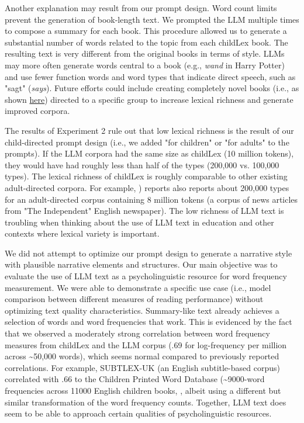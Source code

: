 \documentclass[doc, a4paper]{apa7}
\begin{document}
Another explanation may result from our prompt design. Word count limits prevent the generation of book-length text. We prompted the LLM multiple times to compose a summary for each book. This procedure allowed us to generate a substantial number of words related to the topic from each childLex book. The resulting text is very different from the original books in terms of style. LLMs may more often generate words central to a book (e.g., \textit{wand} in Harry Potter) and use fewer function words and word types that indicate direct speech, such as "sagt" (\textit{says}). Future efforts could include creating completely novel books (i.e., as shown \href{https://medium.com/@baen2810/ai-assisted-writing-of-a-book-cataclysm-67788412fb31}{here}) directed to a specific group to increase lexical richness and generate improved corpora. 

The results of Experiment 2 rule out that low lexical richness is the result of our child-directed prompt design (i.e., we added "for children" or "for adults" to the prompts). If the LLM corpora had the same size as childLex (10 million tokens), they would have had roughly less than half of the types (200,000 vs. 100,000 types). The lexical richness of childLex is roughly comparable to other existing adult-directed corpora. For example, \citet{baayen_word_2001}) reports also reports about 200,000 types for an adult-directed corpus containing 8 million tokens (a corpus of news articles from "The Independent" English newspaper). The low richness of LLM text is troubling when thinking about the use of LLM text in education \citep[see also ][]{kasneci_chatgpt_2023} and other contexts where lexical variety is important.

We did not attempt to optimize our prompt design to generate a narrative style with plausible narrative elements and structures. Our main objective was to evaluate the use of LLM text as a psycholinguistic resource for word frequency measurement. We were able to demonstrate a specific use case (i.e., model comparison between different measures of reading performance) without optimizing text quality characteristics. Summary-like text already achieves a selection of words and word frequencies that work. This is evidenced by the fact that we observed a moderately strong correlation between word frequency measures from childLex and the LLM corpus (.69 for log-frequency per million across \textasciitilde 50,000 words), which seems normal compared to previously reported correlations. For example, SUBTLEX-UK (an English subtitle-based corpus) correlated with .66 to the Children Printed Word Database (\textasciitilde 9000-word frequencies across 11000 English children books, \citep{van_heuven_subtlex-uk_2014}, albeit using a different but similar transformation of the word frequency counts. Together, LLM text does seem to be able to approach certain qualities of psycholinguistic resources. 
\end{document}
